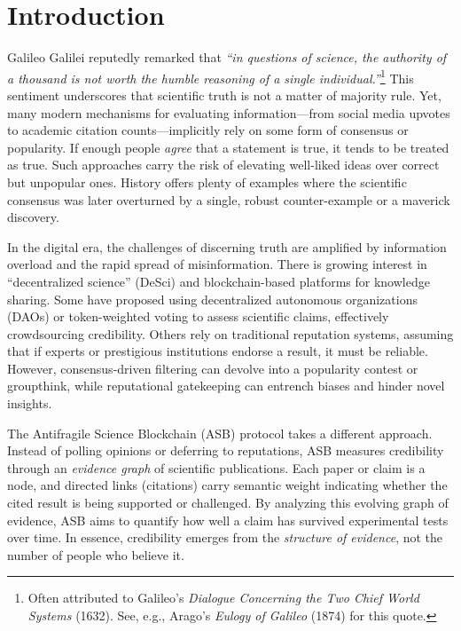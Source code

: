\section{Introduction}
Galileo Galilei reputedly remarked that \emph{``in questions of science, the authority of a thousand is not worth the humble reasoning of a single individual.''}\footnote{Often attributed to Galileo's \emph{Dialogue Concerning the Two Chief World Systems} (1632). See, e.g., Arago's \emph{Eulogy of Galileo} (1874) for this quote.} This sentiment underscores that scientific truth is not a matter of majority rule. Yet, many modern mechanisms for evaluating information---from social media upvotes to academic citation counts---implicitly rely on some form of consensus or popularity. If enough people \emph{agree} that a statement is true, it tends to be treated as true. Such approaches carry the risk of elevating well-liked ideas over correct but unpopular ones. History offers plenty of examples where the scientific consensus was later overturned by a single, robust counter-example or a maverick discovery.

In the digital era, the challenges of discerning truth are amplified by information overload and the rapid spread of misinformation. There is growing interest in ``decentralized science'' (DeSci) and blockchain-based platforms for knowledge sharing. Some have proposed using decentralized autonomous organizations (DAOs) or token-weighted voting to assess scientific claims, effectively crowdsourcing credibility. Others rely on traditional reputation systems, assuming that if experts or prestigious institutions endorse a result, it must be reliable. However, consensus-driven filtering can devolve into a popularity contest or groupthink, while reputational gatekeeping can entrench biases and hinder novel insights.

The Antifragile Science Blockchain (ASB) protocol takes a different approach. Instead of polling opinions or deferring to reputations, ASB measures credibility through an \emph{evidence graph} of scientific publications. Each paper or claim is a node, and directed links (citations) carry semantic weight indicating whether the cited result is being supported or challenged. By analyzing this evolving graph of evidence, ASB aims to quantify how well a claim has survived experimental tests over time. In essence, credibility emerges from the \emph{structure of evidence}, not the number of people who believe it.

